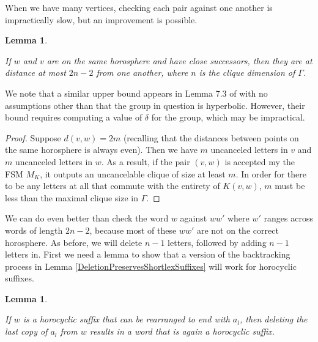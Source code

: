 \documentclass[10pt,a4paper]{amsart}
\newtheorem{lemma}[theorem]{Lemma}
\theoremstyle{definition}
\theoremstyle{remark}
\begin{document}
	When we have many vertices, checking each pair against one another is impractically slow, but an improvement is possible. 
	
	\begin{lemma}\label{MaximumDistanceForDivergenceEdge}
		
		If $w$ and $v$ are on the same horosphere and have close successors, then they are at distance at most $2n-2$ from one another, where $n$ is the clique dimension of $\Gamma$.
		
	\end{lemma}
	
	We note that a similar upper bound appears in Lemma 7.3 of \cite{CGSR} with no assumptions other than that the group in question is hyperbolic. However, their bound requires computing a value of $\delta$ for the group, which may be impractical.
	
	\begin{proof}
		
		Suppose $d(v,w)=2m$ (recalling that the distances between points on the same horosphere is always even). Then we have $m$ uncanceled letters in $v$ and $m$ uncanceled letters in $w$. As a result, if the pair $(v,w)$ is accepted my the FSM $M_K$, it outputs an uncancelable clique of size at least $m$. In order for there to be any letters at all that commute with the entirety of $K(v,w)$, $m$ must be less than the maximal clique size in $\Gamma$.
	\end{proof}
	
	We can do even better than check the word $w$ against $ww'$ where $w'$ ranges across words of length $2n-2$, because most of these $ww'$ are not on the correct horosphere. As before, we will delete $n-1$ letters, followed by adding $n-1$ letters in. First we need a lemma to show that a version of the backtracking process in Lemma \ref{DeletionPreservesShortlexSuffixes} will work for horocyclic suffixes.
	
	\begin{lemma}\label{DeletionPreservesHorocyclicSuffixes}
		
		If $w$ is a horocyclic suffix that can be rearranged to end with $a_l$, then deleting the last copy of $a_l$ from $w$ results in a word that is again a horocyclic suffix.
		
	\end{lemma}
	
\end{document}
